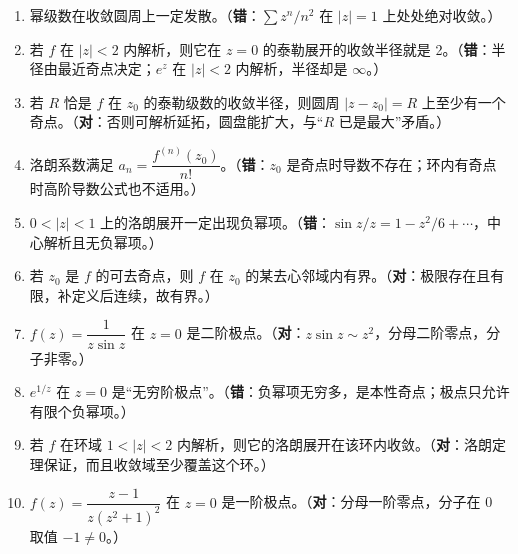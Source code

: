\documentclass[11pt]{ctexart}
\begin{document}
\begin{enumerate}
\item 幂级数在收敛圆周上一定发散。\hfill（\textbf{错}：$\sum z^n/n^2$ 在 $|z|=1$ 上处处绝对收敛。）
\item 若 $f$ 在 $|z|<2$ 内解析，则它在 $z=0$ 的泰勒展开的收敛半径就是 2。\hfill（\textbf{错}：半径由最近奇点决定；$e^z$ 在 $|z|<2$ 内解析，半径却是 $\infty$。）
\item 若 $R$ 恰是 $f$ 在 $z_0$ 的泰勒级数的收敛半径，则圆周 $|z-z_0|=R$ 上至少有一个奇点。\hfill（\textbf{对}：否则可解析延拓，圆盘能扩大，与“$R$ 已是最大”矛盾。）
\item 洛朗系数满足 $a_n=\dfrac{f^{(n)}(z_0)}{n!}$。\hfill（\textbf{错}：$z_0$ 是奇点时导数不存在；环内有奇点时高阶导数公式也不适用。）
\item $0<|z|<1$ 上的洛朗展开一定出现负幂项。\hfill（\textbf{错}：$\sin z/z=1-z^2/6+\cdots$，中心解析且无负幂项。）
\item 若 $z_0$ 是 $f$ 的可去奇点，则 $f$ 在 $z_0$ 的某去心邻域内有界。\hfill（\textbf{对}：极限存在且有限，补定义后连续，故有界。）
\item $f(z)=\dfrac{1}{z\sin z}$ 在 $z=0$ 是二阶极点。\hfill（\textbf{对}：$z\sin z\sim z^2$，分母二阶零点，分子非零。）
\item $e^{1/z}$ 在 $z=0$ 是“无穷阶极点”。\hfill（\textbf{错}：负幂项无穷多，是本性奇点；极点只允许有限个负幂项。）
\item 若 $f$ 在环域 $1<|z|<2$ 内解析，则它的洛朗展开在该环内收敛。\hfill（\textbf{对}：洛朗定理保证，而且收敛域至少覆盖这个环。）
\item $f(z)=\dfrac{z-1}{z(z^2+1)^2}$ 在 $z=0$ 是一阶极点。\hfill（\textbf{对}：分母一阶零点，分子在 0 取值 $-1\ne0$。）
\end{enumerate}
\end{document}
